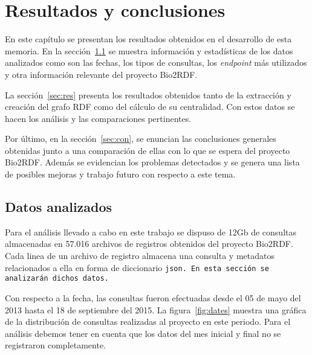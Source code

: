 \chapter{Resultados y conclusiones}
En este capítulo se presentan los resultados obtenidos en el desarrollo de esta
memoria.
En la sección~\ref{sec:datos} se muestra información y estadísticas de los datos
analizados como son las fechas, los tipos de consultas, los \emph{endpoint} más
utilizados y otra información relevante del proyecto Bio2RDF.

La sección~\ref{sec:res} presenta los resultados obtenidos tanto de la
extracción y creación del grafo RDF como del cálculo de su centralidad. Con
estos datos se hacen los análisis y las comparaciones pertinentes.

Por último, en la sección~\ref{sec:con}, se enuncian las conclusiones generales
obtenidas junto a una comparación de ellas con lo que se espera del proyecto
Bio2RDF. Además se evidencian los problemas detectados y se genera una lista de
posibles mejoras y trabajo futuro con respecto a este tema.


\section{Datos analizados}\label{sec:datos}
Para el análisis llevado a cabo en este trabajo se dispuso de 12Gb de consultas
almacenadas en 57.016 archivos de registros obtenidos del proyecto Bio2RDF.
Cada linea de un archivo de registro almacena una consulta y metadatos 
relacionados a ella en forma de diccionario \tt{json}. En esta sección se
analizarán dichos datos.

Con respecto a la fecha, las consultas fueron efectuadas desde el 05 de mayo del
2013 hasta el 18 de septiembre del 2015.
La figura~\ref{fig:dates} muestra una gráfica de la distribución de consultas
realizadas al proyecto en este periodo.
Para el análisis debemos tener en cuenta que los datos del mes inicial y final
no se registraron completamente.

